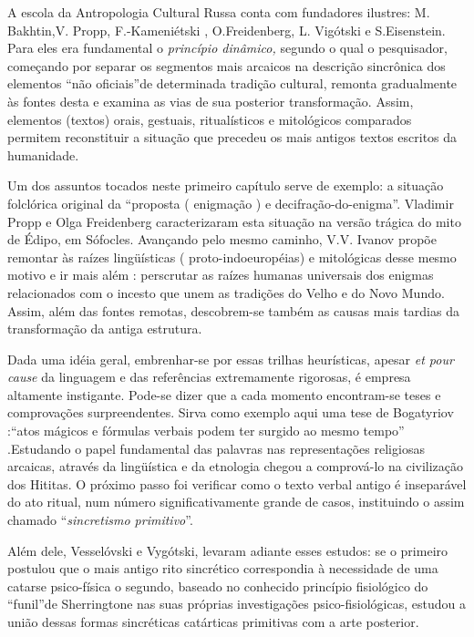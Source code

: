 A escola da Antropologia Cultural Russa conta com fundadores ilustres:
M. Bakhtin,V. Propp, F.-Kameniétski , O.Freidenberg, L. Vigótski e
S.Eisenstein. Para eles era fundamental o \emph{princípio dinâmico,}
segundo o qual o pesquisador, começando por separar os segmentos mais
arcaicos na descrição sincrônica dos elementos ``não oficiais''de
determinada tradição cultural, remonta gradualmente às fontes desta e
examina as vias de sua posterior transformação. Assim, elementos
(textos) orais, gestuais, ritualísticos e mitológicos comparados
permitem reconstituir a situação que precedeu os mais antigos textos
escritos da humanidade.

Um dos assuntos tocados neste primeiro capítulo serve de exemplo: a
situação folclórica original da ``proposta ( enigmação ) e
decifração-do-enigma''. Vladimir Propp e Olga Freidenberg caracterizaram
esta situação na versão trágica do mito de Édipo, em Sófocles. Avançando
pelo mesmo caminho, V.V. Ivanov propõe remontar às raízes lingüísticas (
proto-indoeuropéias) e mitológicas desse mesmo motivo e ir mais além :
perscrutar as raízes humanas universais dos enigmas relacionados com o
incesto que unem as tradições do Velho e do Novo Mundo. Assim, além das
fontes remotas, descobrem-se também as causas mais tardias da
transformação da antiga estrutura.

Dada uma idéia geral, embrenhar-se por essas trilhas heurísticas, apesar
\emph{et pour cause} da linguagem e das referências extremamente
rigorosas, é empresa altamente instigante. Pode-se dizer que a cada
momento encontram-se teses e comprovações surpreendentes. Sirva como
exemplo aqui uma tese de Bogatyriov :``atos mágicos e fórmulas verbais
podem ter surgido ao mesmo tempo'' .Estudando o papel fundamental das
palavras nas representações religiosas arcaicas, através da lingüística
e da etnologia chegou a comprová-lo na civilização dos Hititas. O
próximo passo foi verificar como o texto verbal antigo é inseparável do
ato ritual, num número significativamente grande de casos, instituindo o
assim chamado ``\emph{sincretismo primitivo}''.

Além dele, Vesselóvski e Vygótski, levaram adiante esses estudos: se o
primeiro postulou que o mais antigo rito sincrético correspondia à
necessidade de uma catarse psico-física o segundo, baseado no conhecido
princípio fisiológico do ``funil''de Sherringtone nas suas próprias
investigações psico-fisiológicas, estudou a união dessas formas
sincréticas catárticas primitivas com a arte posterior.

